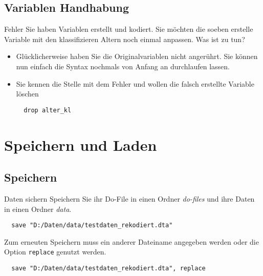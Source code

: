 \subsection{Variablen Handhabung}
\begin{frame}[fragile]{Fehler}  
Sie haben Variablen erstellt und kodiert. Sie möchten die soeben erstelle Variable mit den klassifizieren Altern noch einmal anpassen. Was ist zu tun?
\begin{itemize}
 \item Glücklicherweise haben Sie die Originalvariablen nicht angerührt. Sie können nun einfach die Syntax nochmals von Anfang an durchlaufen lassen.
 \item Sie kennen die Stelle mit dem Fehler und wollen die falsch erstellte Variable löschen
 \begin{lstlisting}
  drop alter_kl
 \end{lstlisting}
\end{itemize}
\end{frame}

\section{Speichern und Laden}
\subsection{Speichern}
\begin{frame}[fragile]{Daten sichern}   
Speichern Sie ihr Do-File in einen Ordner \textit{do-files} und ihre Daten in einen Ordner \textit{data}.
\begin{lstlisting}
  save "D:/Daten/data/testdaten_rekodiert.dta"
\end{lstlisting}
Zum erneuten Speichern muss ein anderer Dateiname angegeben werden oder die Option \texttt{replace} genutzt werden.
\begin{lstlisting}
  save "D:/Daten/data/testdaten_rekodiert.dta", replace
\end{lstlisting}

\end{frame}

